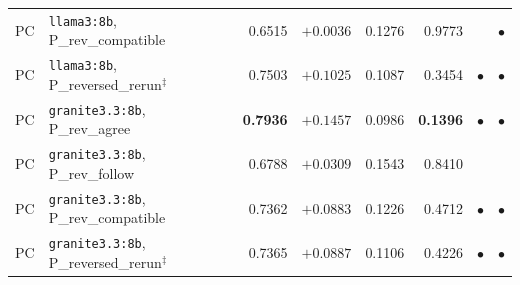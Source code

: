 \documentclass[review]{elsarticle}
\begin{document}
\begin{table}[!ht]
{\begin{tabular}{llrrrrcc}
PC & \texttt{llama3:8b}, P\_rev\_compatible  & 0.6515 & $+0.0036$ & 0.1276 & 0.9773 &  & $\bullet$ \\
PC & \texttt{llama3:8b}, P\_reversed\_rerun$^{\ddagger}$ & 0.7503 & $+0.1025$ & 0.1087 & 0.3454 & $\bullet$ & $\bullet$ \\
PC & \texttt{granite3.3:8b}, P\_rev\_agree      & \textbf{0.7936} & $+0.1457$ & 0.0986 & \textbf{0.1396} & $\bullet$ & $\bullet$ \\
PC & \texttt{granite3.3:8b}, P\_rev\_follow     & 0.6788 & $+0.0309$ & 0.1543 & 0.8410 &  &  \\
PC & \texttt{granite3.3:8b}, P\_rev\_compatible & 0.7362 & $+0.0883$ & 0.1226 & 0.4712 & $\bullet$ & $\bullet$ \\
PC & \texttt{granite3.3:8b}, P\_reversed\_rerun$^{\ddagger}$ & 0.7365 & $+0.0887$ & 0.1106 & 0.4226 & $\bullet$ & $\bullet$ \\
\hline
\end{tabular}}
\end{table}



\end{document}
